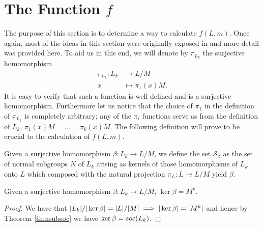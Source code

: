 \chapter{The Function \texorpdfstring{$f$}{f}}

The purpose of this section is to determine a way to calculate $f(L,m)$. Once again, most of the ideas in this section were originally exposed in \cite{DallaVoltaFGNMGAPQ} and more detail was provided here.
To aid us in this end, we will denote by $\pi_{L_k}$ the surjective homomorphism
\begin{align*}
    \pi_{L_k} \colon L_k &\rightarrow L/M \\
                        x &\mapsto \pi_1(x)M.
\end{align*}
It is easy to verify that such a function is well defined and is a surjective homomorphism. Furthermore let us notice that the choice of $\pi_1$ in the definition of $\pi_{L_k}$ is completely arbitrary; any of the $\pi_i$ functions serve as from the definition of $L_k$, 
$\pi_1(x)M = ... = \pi_k(x)M$.
The following definition will prove to be crucial to the calculation of $f(L,m)$.
\begin{definition}
    Given a surjective homomorphism $\beta \colon L_k \rightarrow L/M$, we define the set $\mathscr{S}_\beta$ as the set of normal subgroups $N$ of $L_k$ arising as kernels of those homomorphisms of $L_k$ onto $L$ which composed with the natural projection $\pi_L \colon L \rightarrow L/M$ yield $\beta$.
\end{definition}

\begin{theorem}
    Given a surjective homomorphism $\beta \colon L_k \rightarrow L/M$, $\ker \beta = M^k$.
\end{theorem}

\begin{proof}
    We have that $| L_k |/| \ker \beta | = | L |/| M | \implies | \ker \beta | = | M^k |$ and hence by Theorem \ref{th:nsubsoc} we have $\ker \beta = soc {(L_k)}$.
\end{proof}






